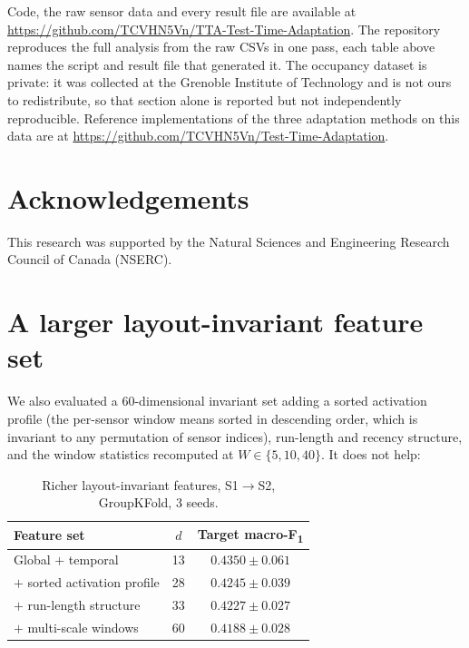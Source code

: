\documentclass[a4paper,fleqn]{cas-dc}
\newcommand{\macf}{macro-F\textsubscript{1}}
\begin{document}
Code, the raw sensor data and every result file are available at
\url{https://github.com/TCVHN5Vn/TTA-Test-Time-Adaptation}. The repository reproduces the
full analysis from the raw CSVs in one pass, each table above names the script and result
file that generated it. The occupancy dataset is private: it
was collected at the Grenoble Institute of Technology and is not ours to redistribute,
so that section alone is reported but not independently reproducible. Reference implementations of
the three adaptation methods on this data are at
\url{https://github.com/TCVHN5Vn/Test-Time-Adaptation}.

\section*{Acknowledgements}

This research was supported by the Natural Sciences and Engineering Research Council of
Canada (NSERC).

\appendix
\section{A larger layout-invariant feature set}
\label{app:inv}

We also evaluated a $60$-dimensional invariant set adding a sorted activation profile (the
per-sensor window means sorted in descending order, which is invariant to any permutation
of sensor indices), run-length and recency structure, and the window statistics recomputed
at $W\in\{5,10,40\}$. It does not help:

\begin{table}[t]
\centering
\caption{Richer layout-invariant features, S1$\to$S2, GroupKFold, 3 seeds.}
\begin{tabular}{lcc}
\toprule
Feature set & $d$ & Target \macf \\
\midrule
Global $+$ temporal                      & 13 & $\mathbf{0.4350}\pm0.061$ \\
$+$ sorted activation profile            & 28 & $0.4245\pm0.039$ \\
$+$ run-length structure                 & 33 & $0.4227\pm0.027$ \\
$+$ multi-scale windows                  & 60 & $0.4188\pm0.028$ \\
\bottomrule
\end{tabular}
\end{table}
\end{document}
